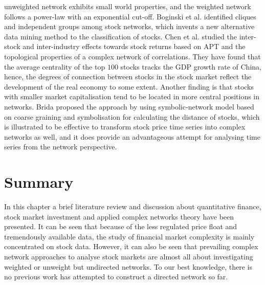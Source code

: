unweighted network exhibits small world properties, and the weighted network follows a power-law with an exponential cut-off. Boginski et al. \cite{statisticalanalysis} identified cliques and independent groups among stock networks, which  invents a new alternative data mining method to the classification of stocks. Chen et al. \cite{CHEN2015224} studied the inter-stock and inter-industry effects towards stock returns based on APT and the topological properties of a complex network of correlations. They have found that the average centrality of the top $100$ stocks tracks the GDP growth rate of China, hence, the degrees of connection between stocks in the stock market reflect the development of the real economy to some extent. Another finding is that stocks with smaller market capitalisation tend to be located in more central positions in networks. Brida \cite{brida2002high} proposed the approach by using symbolic-network model based on coarse graining and symbolisation for calculating the distance of stocks, which is illustrated to be effective to transform stock price time series into complex networks as well, and it does provide an advantageous attempt for analysing time series from the network perspective.

\section{Summary}
In this chapter a brief literature review and discussion about quantitative finance, stock market investment and applied complex networks theory have been presented. It can be seen that because of the less regulated price float and tremendously available data, the study of financial market complexity is mainly concentrated on stock data. However, it can also be seen that prevailing complex network approaches to analyse stock markets are almost all about investigating weighted or unweight but undirected networks. To our best knowledge, there is no previous work has attempted to construct a directed network so far.
